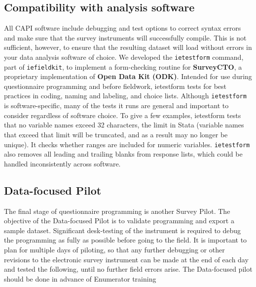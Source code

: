 \subsection{Compatibility with analysis software}
All CAPI software include debugging and test options to correct syntax errors and make sure that the survey instruments will successfully compile.
This is not sufficient, however, to ensure that the resulting dataset will load without errors in your data analysis software of choice.
We developed the \texttt{ietestform} command, part of
\texttt{iefieldkit}, to implement a form-checking routine for \textbf{SurveyCTO}, a proprietary implementation of \textbf{Open Data Kit (ODK)}.
Intended for use during questionnaire programming and before fieldwork, ietestform tests for best practices in coding, naming and labeling, and choice lists.
Although \texttt{ietestform} is software-specific, many of the tests it runs are general and important to consider regardless of software choice.
To give a few examples, ietestform tests that no variable names exceed 32 characters, the limit in Stata (variable names that exceed that limit will be truncated, and as a result may no longer be unique). It checks whether ranges are included for numeric variables.
\texttt{ietestform} also removes all leading and trailing blanks from response lists, which could be handled inconsistently across software.

\subsection{Data-focused Pilot}
The final stage of questionnaire programming is another Survey Pilot.
The objective of the Data-focused Pilot  is to validate programming and export a sample dataset.
Significant desk-testing of the instrument is required to debug the programming as fully as possible before going to the field.
It is important to plan for multiple days of piloting, so that any further debugging or other revisions to the electronic survey instrument can be made at the end of each day and tested the following, until no further field errors arise.
The Data-focused pilot should be done in advance of Enumerator training



